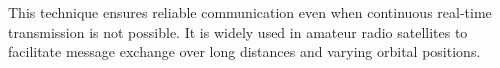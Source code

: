 This technique ensures reliable communication even when continuous real-time transmission is not possible. It is widely used in amateur radio satellites to facilitate message exchange over long distances and varying orbital positions.

